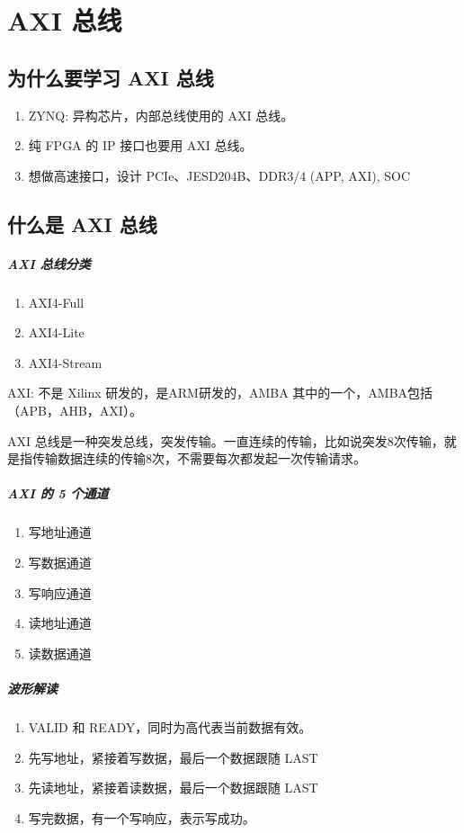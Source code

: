 \chapter{AXI 总线}
\section{为什么要学习 AXI 总线}
\begin{enumerate}
    \item ZYNQ: 异构芯片，内部总线使用的 AXI 总线。
    \item 纯 FPGA 的 IP 接口也要用 AXI 总线。
    \item 想做高速接口，设计 PCIe、JESD204B、DDR3/4 (APP, AXI), SOC
\end{enumerate}
\section{什么是 AXI 总线}
\paragraph{AXI 总线分类}
\begin{enumerate}
    \item AXI4-Full
    \item AXI4-Lite
    \item AXI4-Stream
\end{enumerate}
AXI: 不是 Xilinx 研发的，是ARM研发的，AMBA 其中的一个，AMBA包括（APB，AHB，AXI）。\par
AXI 总线是一种突发总线，突发传输。一直连续的传输，比如说突发8次传输，就是指传输数据连续的传输8次，不需要每次都发起一次传输请求。\par
\paragraph{AXI 的 5 个通道}
\begin{enumerate}
    \item 写地址通道
    \item 写数据通道
    \item 写响应通道
    \item 读地址通道
    \item 读数据通道
\end{enumerate}
\paragraph{波形解读}
\begin{enumerate}
    \item VALID 和 READY，同时为高代表当前数据有效。
    \item 先写地址，紧接着写数据，最后一个数据跟随 LAST
    \item 先读地址，紧接着读数据，最后一个数据跟随 LAST
    \item 写完数据，有一个写响应，表示写成功。
\end{enumerate}

